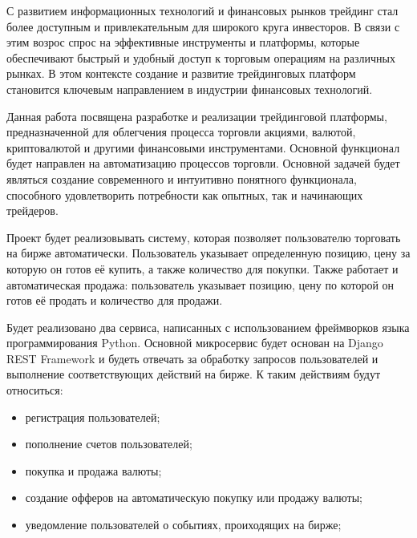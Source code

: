 \label{sec:intro}


С развитием информационных технологий и финансовых рынков трейдинг стал более доступным и привлекательным для широкого круга инвесторов.
В связи с этим возрос спрос на эффективные инструменты и платформы, которые обеспечивают быстрый и удобный доступ к торговым операциям на различных рынках.
В этом контексте создание и развитие трейдинговых платформ становится ключевым направлением в индустрии финансовых технологий.

Данная работа посвящена разработке и реализации трейдинговой платформы, предназначенной для облегчения процесса торговли акциями, валютой, криптовалютой и другими финансовыми инструментами.
Основной функционал будет направлен на автоматизацию процессов торговли.
Основной задачей будет являться создание современного и интуитивно понятного функционала, способного удовлетворить потребности как опытных, так и начинающих трейдеров.

Проект будет реализовывать систему, которая позволяет пользователю торговать на бирже автоматически.
Пользователь указывает определенную позицию, цену за которую он готов её купить, а также количество для покупки.
Также работает и автоматическая продажа: пользователь указывает позицию, цену по которой он готов её продать и количество для продажи.

Будет реализовано два сервиса, написанных с использованием фреймворков языка программирования Python.
Основной микросервис будет основан на Django REST Framework и будеть отвечать за обработку запросов пользователей и выполнение соответствующих действий на бирже.
К таким действиям будут относиться:
\begin{itemize}
    \item регистрация пользователей;
    \item пополнение счетов пользователей;
    \item покупка и продажа валюты;
    \item создание офферов на автоматическую покупку или продажу валюты;
    \item уведомление пользователей о событиях, проиходящих на бирже;
\end{itemize}

